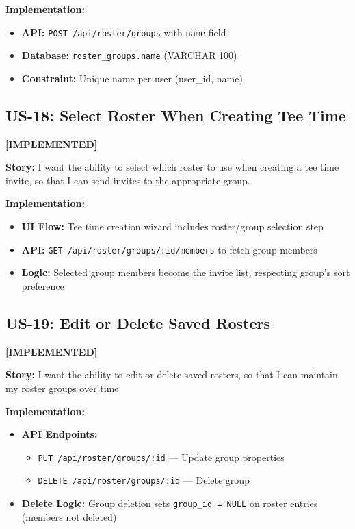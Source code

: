 \documentclass[11pt,a4paper]{article}
\newcommand{\implemented}{\textcolor{implemented}{\textbf{[IMPLEMENTED]}}}
\begin{document}
\textbf{Implementation:}
\begin{itemize}[leftmargin=*]
  \item \textbf{API:} \texttt{POST /api/roster/groups} with \texttt{name} field
  \item \textbf{Database:} \texttt{roster\_groups.name} (VARCHAR 100)
  \item \textbf{Constraint:} Unique name per user (user\_id, name)
\end{itemize}

\subsection{US-18: Select Roster When Creating Tee Time}
\implemented

\textbf{Story:} I want the ability to select which roster to use when creating a tee time invite, so that I can send invites to the appropriate group.

\textbf{Implementation:}
\begin{itemize}[leftmargin=*]
  \item \textbf{UI Flow:} Tee time creation wizard includes roster/group selection step
  \item \textbf{API:} \texttt{GET /api/roster/groups/:id/members} to fetch group members
  \item \textbf{Logic:} Selected group members become the invite list, respecting group's sort preference
\end{itemize}

\subsection{US-19: Edit or Delete Saved Rosters}
\implemented

\textbf{Story:} I want the ability to edit or delete saved rosters, so that I can maintain my roster groups over time.

\textbf{Implementation:}
\begin{itemize}[leftmargin=*]
  \item \textbf{API Endpoints:}
    \begin{itemize}
      \item \texttt{PUT /api/roster/groups/:id} --- Update group properties
      \item \texttt{DELETE /api/roster/groups/:id} --- Delete group
    \end{itemize}
  \item \textbf{Delete Logic:} Group deletion sets \texttt{group\_id = NULL} on roster entries (members not deleted)
\end{itemize}
\end{document}
